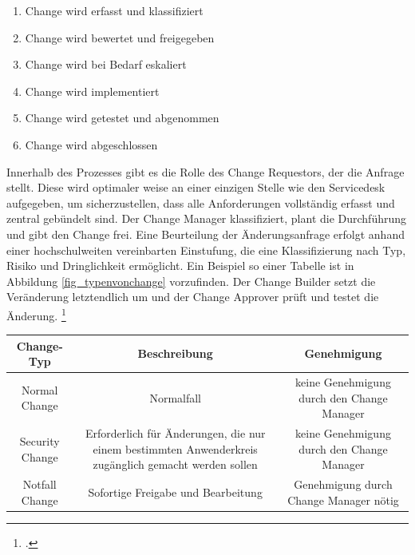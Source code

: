 \begin{enumerate}
	\item Change wird erfasst und klassifiziert
	\item Change wird bewertet und freigegeben
	\item Change wird bei Bedarf eskaliert
	\item Change wird implementiert
	\item Change wird getestet und abgenommen
	\item Change wird abgeschlossen
\end{enumerate}

Innerhalb des Prozesses gibt es die Rolle des Change Requestors, der die Anfrage stellt. Diese wird optimaler weise an einer einzigen Stelle wie den Servicedesk aufgegeben, um sicherzustellen, dass alle Anforderungen vollständig erfasst und zentral gebündelt sind. Der Change Manager klassifiziert, plant die Durchführung und gibt den Change frei. Eine Beurteilung der Änderungsanfrage erfolgt anhand einer hochschulweiten vereinbarten Einstufung, die eine Klassifizierung nach Typ, Risiko und Dringlichkeit ermöglicht. Ein Beispiel so einer Tabelle ist in Abbildung \ref{fig_typenvonchange} vorzufinden. Der Change Builder setzt die Veränderung letztendlich um und der Change Approver prüft und testet die Änderung. \footcite[Vgl.][48]{breiter_implementierung_2011}

\begin{tabular}{|c|c|c|} 
\hline 
\bf Change-Typ & \bf Beschreibung & \bf Genehmigung\\ \hline \hline
Normal Change & Normalfall & keine Genehmigung durch den Change Manager\\
\hline 
Security Change & Erforderlich für Änderungen, 
die nur einem bestimmten Anwenderkreis zugänglich gemacht werden sollen & keine Genehmigung durch den Change Manager\\
\hline
Notfall Change & Sofortige Freigabe und Bearbeitung & Genehmigung durch Change Manager nötig\\
\hline 
\end{tabular}


